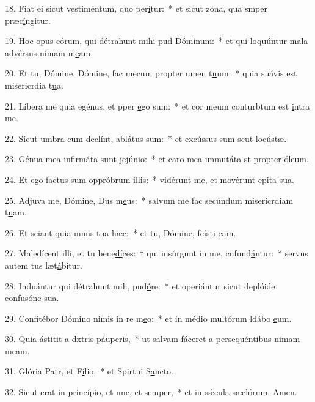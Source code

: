 18. Fiat ei sicut vestiméntum, quo per\uline{í}tur:~* et sicut zona, qua smper præc\uline{í}ngitur.\par 
19. Hoc opus eórum, qui détrahunt mihi pud D\uline{ó}minum:~* et qui loquúntur mala advérsus nimam m\uline{e}am.\par 
20. Et tu, Dómine, Dómine, fac mecum propter nmen t\uline{u}um:~* quia suávis est misericrdia t\uline{u}a.\par 
21. Líbera me quia egénus, et pper \uline{e}go sum:~* et cor meum conturbtum est \uline{i}ntra me.\par 
22. Sicut umbra cum declínt, abl\uline{á}tus sum:~* et excússus sum scut loc\uline{ú}stæ.\par 
23. Génua mea infirmáta sunt  jej\uline{ú}nio:~* et caro mea immutáta st propter \uline{ó}leum.\par 
24. Et ego factus sum oppróbrum \uline{i}llis:~* vidérunt me, et movérunt cpita s\uline{u}a.\par 
25. Adjuva me, Dómine, Dus m\uline{e}us:~* salvum me fac secúndum misericrdiam t\uline{u}am.\par 
26. Et sciant quia mnus t\uline{u}a hæc:~* et tu, Dómine, fcísti \uline{e}am.\par 
27. Maledícent illi, et tu bene\uline{dí}ces:~† qui insúrgunt in me, cnfund\uline{á}ntur:~* servus autem tus læt\uline{á}bitur.\par 
28. Induántur qui détrahunt mih, pud\uline{ó}re:~* et operiántur sicut deplóide confusóne s\uline{u}a.\par 
29. Confitébor Dómino nimis in re m\uline{e}o:~* et in médio multórum ldábo \uline{e}um.\par 
30. Quia ástitit a dxtris p\uline{áu}peris,~* ut salvam fáceret a persequéntibus nimam m\uline{e}am.\par 
31. Glória Patr, et F\uline{í}lio,~* et Spirtui S\uline{a}ncto.\par 
32. Sicut erat in princípio, et nnc, et s\uline{e}mper,~* et in sǽcula sæclórum. \uline{A}men.\par 
